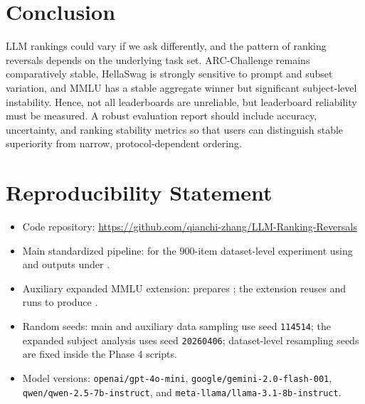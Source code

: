 \documentclass[11pt]{article}
\theoremstyle{definition}
\begin{document}
\section{Conclusion}

LLM rankings could vary if we ask differently, and the pattern of ranking reversals depends on the underlying task set. ARC-Challenge remains comparatively stable, HellaSwag is strongly sensitive to prompt and subset variation, and MMLU has a stable aggregate winner but significant subject-level instability. Hence, not all leaderboards are unreliable, but leaderboard reliability must be measured. A robust evaluation report should include accuracy, uncertainty, and ranking stability metrics so that users can distinguish stable superiority from narrow, protocol-dependent ordering.

\section*{Reproducibility Statement}

\begin{itemize}[leftmargin=*]
    \item Code repository: \url{https://github.com/qianchi-zhang/LLM-Ranking-Reversals}
    \item Main standardized pipeline:  for the 900-item dataset-level experiment using  and outputs under .
    \item Auxiliary expanded MMLU extension:  prepares ; the extension reuses  and runs  to produce .
    \item Random seeds: main and auxiliary data sampling use seed \texttt{114514}; the expanded subject analysis uses seed \texttt{20260406}; dataset-level resampling seeds are fixed inside the Phase 4 scripts.
    \item Model versions: \texttt{openai/gpt-4o-mini}, \texttt{google/gemini-2.0-flash-001}, \texttt{qwen/qwen-2.5-7b-instruct}, and \texttt{meta-llama/llama-3.1-8b-instruct}.
\end{itemize}
\end{document}
